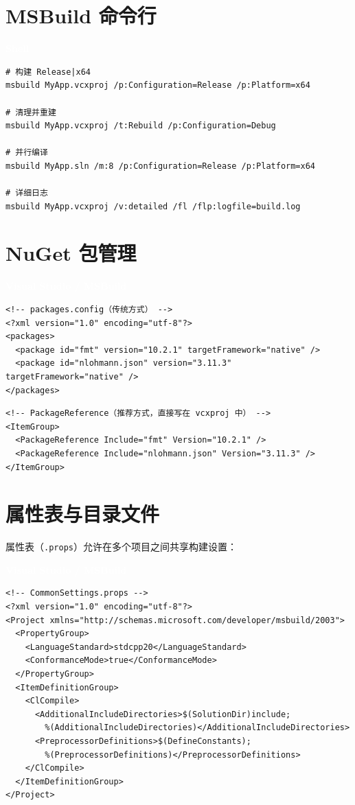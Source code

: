 \documentclass[12pt,a4paper,fontset=fandol]{ctexbook}
\newcommand{\Tp}[1]{\texttt{#1}}
\newcommand{\vslabel}{%
  \noindent\begin{tcolorbox}[sharp corners,colback=vsheadbg,colframe=vsheadbg,
    left=6pt,right=6pt,top=2pt,bottom=2pt,boxrule=0pt]
  \textcolor{white}{\small\bfseries\sffamily Visual Studio / MSBuild}\end{tcolorbox}%
}
\newcommand{\bashlabel}{%
  \noindent\begin{tcolorbox}[sharp corners,colback=cfgheadbg,colframe=cfgheadbg,
    left=6pt,right=6pt,top=2pt,bottom=2pt,boxrule=0pt]
  \textcolor{white}{\small\bfseries\sffamily Shell}\end{tcolorbox}%
}
\begin{document}
\section{MSBuild 命令行}

\bashlabel
\begin{lstlisting}[style=bashstyle]
# 构建 Release|x64
msbuild MyApp.vcxproj /p:Configuration=Release /p:Platform=x64

# 清理并重建
msbuild MyApp.vcxproj /t:Rebuild /p:Configuration=Debug

# 并行编译
msbuild MyApp.sln /m:8 /p:Configuration=Release /p:Platform=x64

# 详细日志
msbuild MyApp.vcxproj /v:detailed /fl /flp:logfile=build.log
\end{lstlisting}

\section{NuGet 包管理}

\vslabel
\begin{lstlisting}[style=xmlstyle]
<!-- packages.config（传统方式） -->
<?xml version="1.0" encoding="utf-8"?>
<packages>
  <package id="fmt" version="10.2.1" targetFramework="native" />
  <package id="nlohmann.json" version="3.11.3" targetFramework="native" />
</packages>
\end{lstlisting}

\begin{lstlisting}[style=xmlstyle]
<!-- PackageReference（推荐方式，直接写在 vcxproj 中） -->
<ItemGroup>
  <PackageReference Include="fmt" Version="10.2.1" />
  <PackageReference Include="nlohmann.json" Version="3.11.3" />
</ItemGroup>
\end{lstlisting}

\section{属性表与目录文件}

属性表（\Tp{.props}）允许在多个项目之间共享构建设置：

\vslabel
\begin{lstlisting}[style=xmlstyle]
<!-- CommonSettings.props -->
<?xml version="1.0" encoding="utf-8"?>
<Project xmlns="http://schemas.microsoft.com/developer/msbuild/2003">
  <PropertyGroup>
    <LanguageStandard>stdcpp20</LanguageStandard>
    <ConformanceMode>true</ConformanceMode>
  </PropertyGroup>
  <ItemDefinitionGroup>
    <ClCompile>
      <AdditionalIncludeDirectories>$(SolutionDir)include;
        %(AdditionalIncludeDirectories)</AdditionalIncludeDirectories>
      <PreprocessorDefinitions>$(DefineConstants);
        %(PreprocessorDefinitions)</PreprocessorDefinitions>
    </ClCompile>
  </ItemDefinitionGroup>
</Project>
\end{lstlisting}
\end{document}
